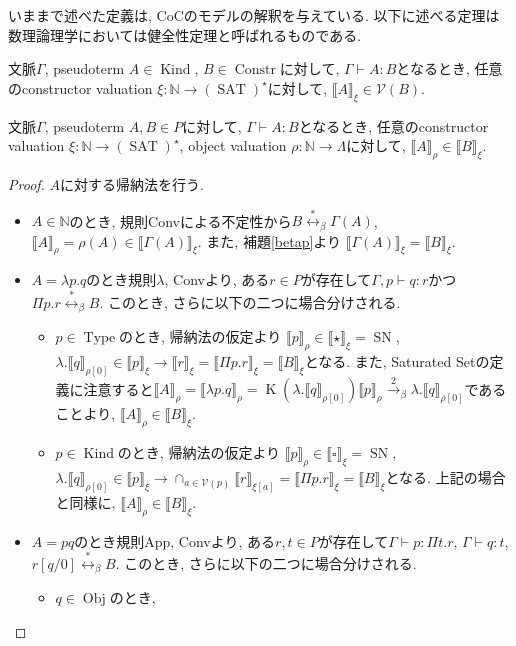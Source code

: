 \documentclass[12pt, titlepage]{ltjsarticle}
\DeclareMathOperator{\SN}{SN}
\DeclareMathOperator{\Obj}{Obj}
\DeclareMathOperator{\Constr}{Constr}
\DeclareMathOperator{\Type}{Type}
\DeclareMathOperator{\Kind}{Kind}
\DeclareMathOperator{\SAT}{SAT}
\DeclareMathOperator{\K}{K}
\newcommand{\iprt}[2]{\llbracket {#1} \rrbracket_ {#2}}
\begin{document}
いままで述べた定義は, CoCのモデルの解釈を与えている. 以下に述べる定理は数理論理学においては健全性定理と呼ばれるものである.

\begin{thm}
 文脈$\Gamma$, pseudoterm $A \in \Kind$, $B \in \Constr$に対して, $\Gamma \vdash A \colon B$となるとき,
 任意のconstructor valuation $\xi : \mathbb{N} \rightarrow (\SAT)^\star$に対して, $\iprt{A}{\xi} \in \mathcal{V}(B)$.
\end{thm}

\begin{thm}
 文脈$\Gamma$, pseudoterm $A, B \in P$に対して, $\Gamma \vdash A \colon B$となるとき,
 任意のconstructor valuation $\xi : \mathbb{N} \rightarrow (\SAT)^\star$, object valuation $\rho : \mathbb{N} \rightarrow \Lambda$に対して, $\iprt{A}{\rho} \in \iprt{B}{\xi}$.
\end{thm}
\begin{proof}
 $A$に対する帰納法を行う.
 \begin{itemize}
  \item $A \in \mathbb{N}$のとき, 規則Convによる不定性から$B \overset{*}{\leftrightarrow}_\beta \Gamma(A)$, $\iprt{A}{\rho} = \rho (A) \in \iprt{\Gamma(A)}{\xi}$.
        また, 補題\ref{betap}より $\iprt{\Gamma(A)}{\xi} = \iprt{B}{\xi}$.
  \item $A = \lambda p. q$のとき規則$\lambda$, Convより, ある$r \in P$が存在して$\Gamma, p \vdash q \colon r$かつ$\Pi p. r \overset{*}{\leftrightarrow}_\beta B$. このとき, さらに以下の二つに場合分けされる.
 \begin{itemize}
  \item $p \in \Type$のとき, 帰納法の仮定より $\iprt{p}{\rho} \in \iprt{\star}{\xi} = \SN$, $\lambda . \iprt{q}{\rho[0]} \in \iprt{p}{\xi} \rightarrow \iprt{r}{\xi} = \iprt{\Pi p. r}{\xi} = \iprt{B}{\xi}$となる.
        また, Saturated Setの定義に注意すると$\iprt{A}{\rho} = \iprt{\lambda p. q}{\rho} = \K (\lambda . \iprt{q}{\rho[0]}) \iprt{p}{\rho} \overset{2}{\rightarrow}_\beta \lambda . \iprt{q}{\rho[0]}$であることより, $\iprt{A}{\rho} \in \iprt{B}{\xi}$.
  \item $p \in \Kind$のとき, 帰納法の仮定より $\iprt{p}{\rho} \in \iprt{\square}{\xi} = \SN$, $\lambda . \iprt{q}{\rho[0]} \in \iprt{p}{\xi} \rightarrow \cap_{a \in \mathcal{V}(p)} \iprt{r}{\xi[a]} = \iprt{\Pi p. r}{\xi} = \iprt{B}{\xi}$となる.
        上記の場合と同様に, $\iprt{A}{\rho} \in \iprt{B}{\xi}$.
 \end{itemize}
  \item $A = p q$のとき規則App, Convより, ある$r, t \in P$が存在して$\Gamma \vdash p \colon \Pi t. r$, $\Gamma \vdash q \colon t$, $r[q/0] \overset{*}{\leftrightarrow}_\beta B$. このとき, さらに以下の二つに場合分けされる.
 \begin{itemize}
  \item $q \in \Obj$のとき,
 \end{itemize}
 \end{itemize}
\end{proof}
\end{document}
